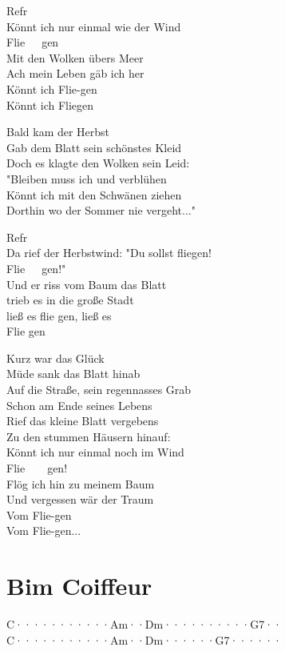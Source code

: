 \documentclass[
  letterpaper,
]{scrbook}
\begin{document}
Refr\\
Könnt ich nur einmal wie der Wind\\
Flie~~~gen\\
Mit den Wolken übers Meer\\
Ach mein Leben gäb ich her\\
Könnt ich Flie-gen\\
Könnt ich Fliegen

Bald kam der Herbst\\
Gab dem Blatt sein schönstes Kleid\\
Doch es klagte den Wolken sein Leid:\\
"Bleiben muss ich und verblühen\\
Könnt ich mit den Schwänen ziehen\\
Dorthin wo der Sommer nie vergeht..."

Refr\\
Da rief der Herbstwind: "Du sollst fliegen!\\
Flie~~~gen!"\\
Und er riss vom Baum das Blatt\\
trieb es in die große Stadt\\
ließ es flie gen, ließ es\\
Flie gen

Kurz war das Glück\\
Müde sank das Blatt hinab\\
Auf die Straße, sein regennasses Grab\\
Schon am Ende seines Lebens\\
Rief das kleine Blatt vergebens\\
Zu den stummen Häusern hinauf:\\
Könnt ich nur einmal noch im Wind\\
Flie~~~~gen!\\
Flög ich hin zu meinem Baum\\
Und vergessen wär der Traum\\
Vom Flie-gen\\
Vom Flie-gen...

\hypertarget{bim-coiffeur}{%
\chapter{Bim Coiffeur}\label{bim-coiffeur}}

\textbar C·······\textbar····Am··\textbar Dm······\textbar····G7··\textbar{}\\
\textbar C·······\textbar····Am··\textbar Dm······\textbar G7······\textbar{}
\end{document}
